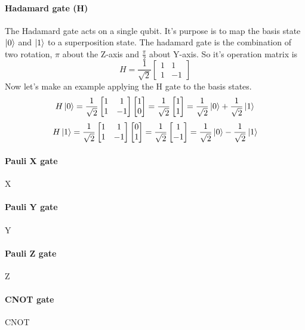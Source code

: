 \documentclass[main.tex]{subfiles}
\theoremstyle{definition}
\begin{document}
	\paragraph{Hadamard gate (H)} The Hadamard gate acts on a single qubit. It's purpose is to map the
	basis state $\ket{0}$  and $\ket{1}$ to a superposition state.
	The hadamard gate is the combination of two rotation, $\pi$ about the Z-axis and 
	$\frac{\pi}{2}$ about Y-axis. 
	So it's operation matrix is
	\begin{equation}
	H=\frac{1}{\sqrt{2}}
	\begin{bmatrix}
	1 & 1\\
	1 & -1
	\end{bmatrix}
	\end{equation}
	Now let's make an example applying the H gate to the basis states.
	\begin{equation}
	H\ket{0}=\frac{1}{\sqrt{2}}
	\begin{bmatrix}
	1 & 1\\
	1 & -1
	\end{bmatrix}
	\begin{bmatrix}
	1 \\
	0
	\end{bmatrix}
	=\frac{1}{\sqrt{2}}
	\begin{bmatrix}
	1 \\
	1
	\end{bmatrix}
	=
	\frac{1}{\sqrt{2}}\ket{0}+\frac{1}{\sqrt{2}}\ket{1}
	\end{equation}
	\begin{equation}
	H\ket{1}=\frac{1}{\sqrt{2}}
	\begin{bmatrix}
	1 & 1\\
	1 & -1
	\end{bmatrix}
	\begin{bmatrix}
	0 \\
	1
	\end{bmatrix}
	=\frac{1}{\sqrt{2}}
	\begin{bmatrix}
	1 \\
	-1
	\end{bmatrix}
	=
	\frac{1}{\sqrt{2}}\ket{0}-\frac{1}{\sqrt{2}}\ket{1}
	\end{equation}
	
	
	\paragraph{Pauli X gate}X
	\paragraph{Pauli Y gate}Y
	\paragraph{Pauli Z gate}Z
	\paragraph{CNOT gate}CNOT
	
	
	
\end{document}
